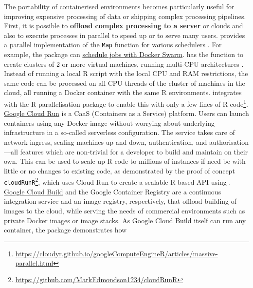 The portability of containerised environments becomes particularly
useful for improving expensive processing of data or shipping complex
processing pipelines. First, it is possible to \textbf{offload complex
processing to a server} or clouds and also to execute processes in
parallel to speed up or to serve many users.
\textbf{} provides a parallel implementation of the
\texttt{Map} function for various schedulers \citep{Lang2017batchtools}.
For example, the package can
\href{https://mllg.github.io/batchtools/reference/makeClusterFunctionsDocker.html}{schedule
jobs with Docker Swarm}. \textbf{} has the
function  to create clusters of 2 or more
virtual machines, running multi-CPU architectures
\citep{googleComputeEngineR_2019}. Instead of running a local R script
with the local CPU and RAM restrictions, the same code can be processed
on all CPU threads of the cluster of machines in the cloud, all running
a Docker container with the same R environments.
 integrates with the R parallelisation package
 \citep{cran_future} to enable this with only a few
lines of R
code\footnote{\href{https://cloudyr.github.io/googleComputeEngineR/articles/massive-parallel.html}{https://cloudyr.github.io/googleComputeEngineR/articles/massive-parallel.html}}.
\href{https://cloud.run}{Google Cloud Run} is a CaaS (Containers as a
Service) platform. Users can launch containers using any Docker image
without worrying about underlying infrastructure in a so-called
serverless configuration. The service takes care of network ingress,
scaling machines up and down, authentication, and authorisation---all
features which are non-trivial for a developer to build and maintain on
their own. This can be used to scale up R code to millions of instances
if need be with little or no changes to existing code, as demonstrated
by the proof of concept
\texttt{cloudRunR}\footnote{\href{https://github.com/MarkEdmondson1234/cloudRunR}{https://github.com/MarkEdmondson1234/cloudRunR}},
which uses Cloud Run to create a scalable R-based API using
 \citep{cran_plumber}.
\href{https://cloud.google.com/cloud-build/}{Google Cloud Build} and the
Google Container Registry are a continuous integration service and an
image registry, respectively, that offload building of images to the
cloud, while serving the needs of commercial environments such as
private Docker images or image stacks. As Google Cloud Build itself can
run any container, the package  demonstrates how
